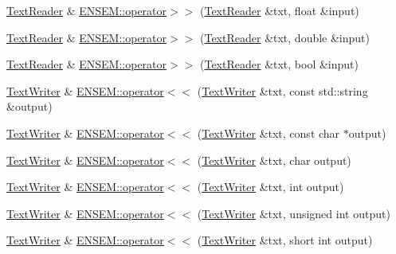 \begin{DoxyCompactItemize}
\mbox{\hyperlink{classENSEM_1_1TextReader}{Text\+Reader}} \& \mbox{\hyperlink{group__io_gadcd1421418b0255e88751789c70e23e4}{E\+N\+S\+E\+M\+::operator$>$$>$}} (\mbox{\hyperlink{classENSEM_1_1TextReader}{Text\+Reader}} \&txt, float \&input)
\item 
\mbox{\hyperlink{classENSEM_1_1TextReader}{Text\+Reader}} \& \mbox{\hyperlink{group__io_gaae0d5e305c1af4b3085b3a4f3b15f4e9}{E\+N\+S\+E\+M\+::operator$>$$>$}} (\mbox{\hyperlink{classENSEM_1_1TextReader}{Text\+Reader}} \&txt, double \&input)
\item 
\mbox{\hyperlink{classENSEM_1_1TextReader}{Text\+Reader}} \& \mbox{\hyperlink{group__io_ga807a1dae246fb10630e4e967d01b2e85}{E\+N\+S\+E\+M\+::operator$>$$>$}} (\mbox{\hyperlink{classENSEM_1_1TextReader}{Text\+Reader}} \&txt, bool \&input)
\item 
\mbox{\hyperlink{classENSEM_1_1TextWriter}{Text\+Writer}} \& \mbox{\hyperlink{group__io_ga30a170c6f2ec820ececb3d3525e2ffa6}{E\+N\+S\+E\+M\+::operator$<$$<$}} (\mbox{\hyperlink{classENSEM_1_1TextWriter}{Text\+Writer}} \&txt, const std\+::string \&output)
\item 
\mbox{\hyperlink{classENSEM_1_1TextWriter}{Text\+Writer}} \& \mbox{\hyperlink{group__io_gaf097695886fb51a3d6c35f6b0bac14fc}{E\+N\+S\+E\+M\+::operator$<$$<$}} (\mbox{\hyperlink{classENSEM_1_1TextWriter}{Text\+Writer}} \&txt, const char $\ast$output)
\item 
\mbox{\hyperlink{classENSEM_1_1TextWriter}{Text\+Writer}} \& \mbox{\hyperlink{group__io_ga1d3217dcbc1fea5b302c0b53833dad39}{E\+N\+S\+E\+M\+::operator$<$$<$}} (\mbox{\hyperlink{classENSEM_1_1TextWriter}{Text\+Writer}} \&txt, char output)
\item 
\mbox{\hyperlink{classENSEM_1_1TextWriter}{Text\+Writer}} \& \mbox{\hyperlink{group__io_ga0dc2ec2539e29f2482b5e033daf6b013}{E\+N\+S\+E\+M\+::operator$<$$<$}} (\mbox{\hyperlink{classENSEM_1_1TextWriter}{Text\+Writer}} \&txt, int output)
\item 
\mbox{\hyperlink{classENSEM_1_1TextWriter}{Text\+Writer}} \& \mbox{\hyperlink{group__io_gafe8260aa83dc65480d323272a62f2ec0}{E\+N\+S\+E\+M\+::operator$<$$<$}} (\mbox{\hyperlink{classENSEM_1_1TextWriter}{Text\+Writer}} \&txt, unsigned int output)
\item 
\mbox{\hyperlink{classENSEM_1_1TextWriter}{Text\+Writer}} \& \mbox{\hyperlink{group__io_gab16e79cd4973872500ffbdacdc04be37}{E\+N\+S\+E\+M\+::operator$<$$<$}} (\mbox{\hyperlink{classENSEM_1_1TextWriter}{Text\+Writer}} \&txt, short int output)
\item 

\end{DoxyCompactItemize}
